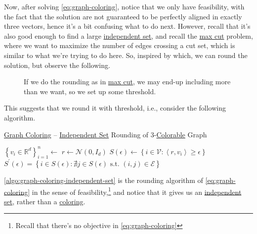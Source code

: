 Now, after solving \autoref{eq:graph-coloring}, notice that we only have feasibility, with the fact that the solution are not guaranteed to be perfectly aligned in exactly three vectors, hence it's a bit confusing what to do next. However, recall that it's also good enough to find a large \hyperref[def:independent-set]{independent set}, and recall the \hyperref[prb:max-cut]{max cut} problem, where we want to maximize the number of edges crossing a cut set, which is similar to what we're trying to do here. So, inspired by which, we can round the solution, but observe the following.

\begin{figure}[H]
	\centering
	\caption{If we do the rounding as in \hyperref[prb:max-cut]{max cut}, we may end-up including more than we want, so we set up some threshold.}
	\label{fig:3-coloring-threshold}
\end{figure}

This suggests that we round it with threshold, i.e., consider the following algorithm.

\begin{algorithm}[H]\label{algo:graph-coloring-independent-set}
	\DontPrintSemicolon{}
	\caption{\hyperref[prb:graph-coloring]{Graph Coloring} -- \hyperref[def:independent-set]{Independent Set} Rounding of \(3\)-\hyperref[def:coloring]{Colorable} Graph}
	\BlankLine
	\(\left\{ v_i \in \mathbb{R} ^d\right\} _{i=1}^n \gets\)\;
	\(r \gets \mathcal{N} (0, I_d)\)\label{algo:graph-coloring-independent-set-r}
	\(S(\epsilon )\gets\left\{ i\in \mathcal{V} \colon \left\langle r, v_i \right\rangle \geq \epsilon   \right\} \)
	\(S^\prime (\epsilon )= \left\{ i\in S(\epsilon )\colon \nexists j\in S(\epsilon ) \text{ s.t. } (i, j)\in \mathcal{E} \right\} \)
	\;
\end{algorithm}

\begin{remark}
	\autoref{algo:graph-coloring-independent-set} is the rounding algorithm of \autoref{eq:graph-coloring} in the sense of feasibility,\footnote{Recall that there's no objective in \autoref{eq:graph-coloring}} and notice that it gives us an \hyperref[def:independent-set]{independent set}, rather than a \hyperref[def:coloring]{coloring}.
\end{remark}